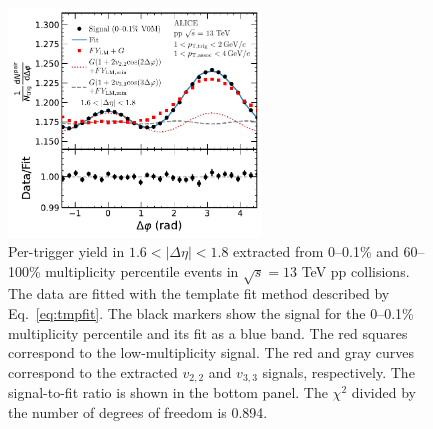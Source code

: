 \begin{figure}[h!]
	\centering
	\hspace{-3em}\includegraphics[width=0.6\textwidth]{figures/FIG2_FlowExt.pdf} 
	\caption{Per-trigger yield in $1.6<|\Delta\eta|<1.8$ extracted from 0--0.1\% and 60--100\% multiplicity percentile events in $\sqrt{s}=13$ TeV pp collisions. The data are fitted with the template fit method described by Eq.~\ref{eq:tmpfit}. The black markers show the signal for the 0--0.1\% multiplicity percentile and its fit as a blue band. The red squares correspond to the low-multiplicity signal. The red and gray curves correspond to the extracted $v_{2,2}$ and $v_{3,3}$ signals, respectively. The signal-to-fit ratio is shown in the bottom panel. The $\chi^{2}$ divided by the number of degrees of freedom is 0.894.}
	\label{fig:flowext}
\end{figure}

